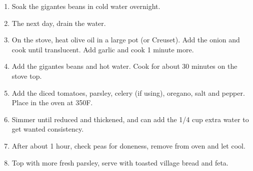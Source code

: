 \bigskip

\begin{enumerate}
    \item Soak the gigantes beans in cold water overnight.
    \item The next day, drain the water.
    \item On the stove, heat olive oil in a large pot (or Creuset). Add the onion and cook until translucent. Add garlic and cook 1 minute more.
    \item Add the gigantes beans and hot water. Cook for about 30 minutes on the stove top.
    \item Add the diced tomatoes, parsley, celery (if using), oregano, salt and pepper. Place in the oven at 350\degree F.
    \item Simmer until reduced and thickened, and can add the 1/4 cup extra water to get wanted consistency.
    \item After about 1 hour, check peas for doneness, remove from oven and let cool.
    \item Top with more fresh parsley, serve with toasted village bread and feta.
\end{enumerate}

